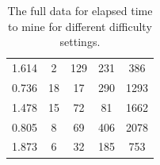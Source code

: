 \documentclass{l4proj}
\begin{document}
\begin{appendices}
\begin{table}[!ht]
\begin{tabular}{ccccc}
    1.614      & 2          & 129        & 231        & 386        \\
    0.736      & 18         & 17         & 290        & 1293       \\
    1.478      & 15         & 72         & 81         & 1662       \\
    0.805      & 8          & 69         & 406        & 2078       \\
    1.873      & 6          & 32         & 185        & 753       
    \end{tabular}
    \vspace{1cm}
    \caption{
        The full data for elapsed time to mine for different difficulty settings.
    }
    \label{tab:mining}
\end{table}
\end{appendices}




\end{document}
